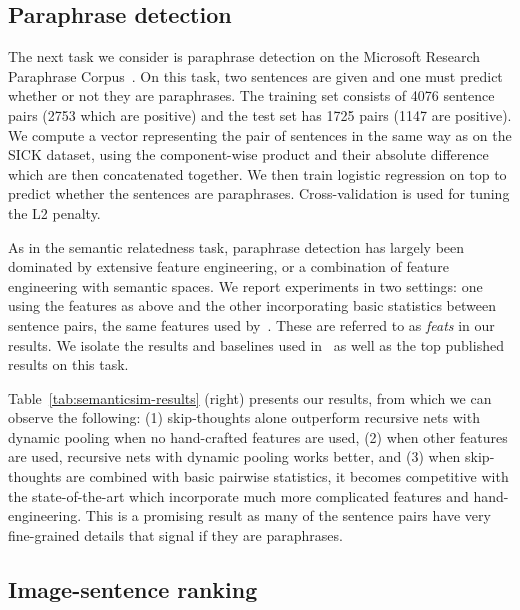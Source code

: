\documentclass{article} \usepackage{nips15submit_e,times}
\begin{document}
\subsection{Paraphrase detection}

The next task we consider is paraphrase detection on the Microsoft Research Paraphrase Corpus~\cite{dolan2004unsupervised}. On this task, two sentences are given and one must predict whether or not they are paraphrases. The training set consists of 4076 sentence pairs (2753 which are positive) and the test set has 1725 pairs (1147 are positive). We compute a vector representing the pair of sentences in the same way as on the SICK dataset, using the component-wise product  and their absolute difference  which are then concatenated together. We then train logistic regression on top to predict whether the sentences are paraphrases. Cross-validation is used for tuning the L2 penalty. 

As in the semantic relatedness task, paraphrase detection has largely been dominated by extensive feature engineering, or a combination of feature engineering with semantic spaces. We report experiments in two settings: one using the features as above and the other incorporating basic statistics between sentence pairs, the same features used by~\cite{socher2011dynamic}. These are referred to as {\it feats} in our results. We isolate the results and baselines used in~\cite{socher2011dynamic} as well as the top published results on this task.

Table~\ref{tab:semanticsim-results} (right) presents our results, from which we can observe the following: (1) skip-thoughts alone outperform recursive nets with dynamic pooling when no hand-crafted features are used, (2) when other features are used, recursive nets with dynamic pooling works better, and (3) when skip-thoughts are combined with basic pairwise statistics, it becomes competitive with the state-of-the-art which incorporate much more complicated features and hand-engineering. This is a promising result as many of the sentence pairs have very fine-grained details that signal if they are paraphrases. 


\subsection{Image-sentence ranking}
\label{sec:rank}
\end{document}
